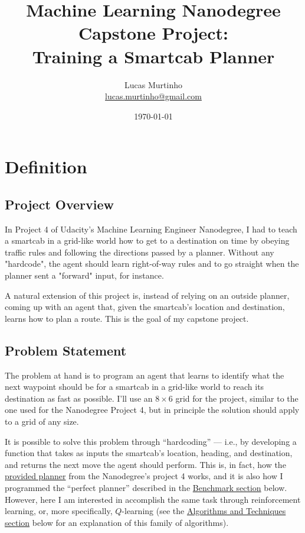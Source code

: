 \documentclass{article}
\title{Machine Learning Nanodegree Capstone Project:\\Training a Smartcab Planner}
\author{Lucas Murtinho \\ \url{lucas.murtinho@gmail.com}}
\date{\today}
\begin{document}
\maketitle
\tableofcontents
\newpage

\section{Definition}


\subsection{Project Overview}

In Project 4 of Udacity's Machine Learning Engineer Nanodegree, I had to teach a smartcab in a grid-like world how to get to a destination on time by obeying traffic rules and following the directions passed by a planner. Without any "hardcode", the agent should learn right-of-way rules and to go straight when the planner sent a "forward" input, for instance.

A natural extension of this project is, instead of relying on an outside planner, coming up with an agent that, given the smartcab's location and destination, learns how to plan a route. This is the goal of my capstone project.


\subsection{Problem Statement}

The problem at hand is to program an agent that learns to identify what the next waypoint should be for a smartcab in a grid-like world to reach its destination as fast as possible. I'll use an $8\times6$ grid for the project, similar to the one used for the Nanodegree Project 4, but in principle the solution should apply to a grid of any size.

It is possible to solve this problem through ``hardcoding'' --- i.e., by developing a function that takes as inputs the smartcab's location, heading, and destination, and returns the next move the agent should perform. This is, in fact, how the \href{https://github.com/udacity/machine-learning/blob/77ca1180cf1251d03dd07b590c91d384d4c18064/projects/smartcab/smartcab/planner.py}{provided planner} from the Nanodegree's project 4 works, and it is also how I programmed the ``perfect planner'' described in the \hyperref[sec:benchmark]{Benchmark section} below.
However, here I am interested in accomplish the same task through reinforcement learning, or, more specifically, $Q$-learning (see the \hyperref[sec:algos]{Algorithms and Techniques section} below for an explanation of this family of algorithms). 
\end{document}
